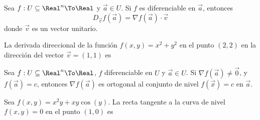 \begin{frame}
  \begin{thm}
    Sea $f:U\subseteq\Real^n\To\Real$ y $\vec{a}\in U$. Si $f$ es diferenciable en $\vec{a}$, entonces
    $$D_{\vec{v}}f(\vec{a})=\nabla f(\vec{a})\cdot\vec{v}$$
    donde $\vec{v}$ es un vector unitario.
  \end{thm}
\end{frame}

\begin{frame}
  \begin{eg}
    La derivada direccional de la función $f(x,y)=x^2+y^2$ en el punto $(2,2)$ en la dirección del vector $\vec{v}=(1,1)$ es
  \end{eg}
\end{frame}

\begin{frame}
  \begin{thm}
    Sea $f:U\subseteq\Real^n\To\Real$, $f$ diferenciable en $U$ y $\vec{a}\in U$. Si $\nabla f(\vec{a})\neq\vec{0}$, y $f(\vec{a})=c$, entonces $\nabla f(\vec{a})$ es ortogonal al conjunto de nivel $f(\vec{x})=c$ en $\vec{a}$.
  \end{thm}
\end{frame}

\begin{frame}
  \begin{eg}
    Sea $f(x,y)=x^2y+xy\cos(y)$. La recta tangente a la curva de nivel $f(x,y)=0$ en el punto $(1,0)$ es
  \end{eg}
\end{frame}

